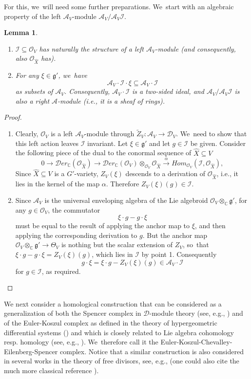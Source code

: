 \documentclass[11pt]{article}
\newcommand{\ie}{i.e.,\xspace}
\newcommand{\resp}{resp.\xspace}
\newcommand{\skpt}{\smallskip}
\let\mathds\mathbb
\newtheorem{lem}[thm]{Lemma}
\newcommand{\dC}{{\mathds C}}\let\C\dC
\newcommand{\cA}{\mathscr{A}}
\newcommand{\cD}{\mathscr{D}}
\newcommand{\cI}{\mathcal{I}}
\newcommand{\cO}{\mathcal{O}}\let\O\cO
\newcommand{\frg}{\mathfrak{g}}
\begin{document}
For this, we~will need some further preparations. We~start with an algebraic property of the left $\cA_V$\nobreakdash-mod\-ule
$\cA_V/\cA_V\cI$.

\skpt
\begin{lem}
\label{lem:IleftAmod}
\begin{enumerate}
\item
$\cI\subseteq\cO_V$ has naturally the structure of a left $\cA_V$\nobreakdash-mod\-ule (and consequently, also $\cO_{\hat{X}}$ has).

\item
For any $\xi\in\frg'$, we~have
\[
\cA_V\cdot \cI \cdot \xi \subseteq\cA_V\cdot \cI
\]
as subsets of $\cA_V$. Consequently, $\cA_V\cdot \cI$ is a two-sided ideal, and $\cA_V/\cA_V\cI$
is also a right $\cA$\nobreakdash-mod\-ule (\ie it is a sheaf of rings).
\end{enumerate}
\end{lem}

\skpt
\begin{proof}
\begin{enumerate}
\item
Clearly, $\cO_V$ is a left $\cA_V$\nobreakdash-mod\-ule
through $\tilde{Z}_V \colon \cA_V\to \cD_V$. We~need to show that this left action leaves $\cI$ invariant. Let $\xi\in \frg'$ and let $g\in \cI$ be given.
Consider the following piece
of the dual to the conormal sequence of $\hat{X}\subseteq V$
\[
0\to
{\cD\!}er_{\dC}(\cO_{\hat{X}})
\to
{\cD\!er}_{\dC}(\cO_V)\otimes_{\cO_V}\cO_{\hat{X}}
\stackrel{\alpha}{\to} {H\!}om_{\cO_V}(\cI,\cO_{\hat{X}}),
\]
Since $\hat{X}\subseteq V$ is a $G'$-variety, $Z_V(\xi)$ descends to a derivation of $\cO_{\hat{X}}$, \ie it lies in the kernel of the map $\alpha$. Therefore $Z_V(\xi)(g)\in \cI$.
\item
Since $\cA_V$ is the universal enveloping algebra of the Lie algebroid $\cO_V\otimes_\dC \frg'$, for any $g\in \cO_V$, the commutator
\[
\xi\cdot g-g\cdot\xi
\]
must be equal to the result of applying the anchor map to $\xi$, and then applying the corresponding derivation to $g$. But the anchor map $\cO_V\otimes_\dC\frg'\to \Theta_V$ is nothing but the scalar extension of $Z_V$, so~that $\xi\cdot g-g\cdot\xi=Z_V(\xi)(g)$, which lies in $\cI$ by point 1. Consequently
\[
g\cdot \xi=\xi\cdot g-Z_V(\xi)(g) \in \cA_V\cdot \cI
\]
for $g\in \mathcal{I}$, as required.\qedhere
\end{enumerate}
\end{proof}

We next consider a homological construction that can be considered as a generalization of both the Spencer complex in $\cD$\nobreakdash-mod\-ule theory (see, e.g., \cite[Lem.\,1.5.27.]{Hotta}) and of the Euler-Koszul complex as defined in the theory of hypergeometric differential systems (\cite[\S 4]{MMW}) and which is closely related to Lie algebra cohomology \resp homology (see, e.g., \cite[\S VII.4]{HiltonStammbach}). We~therefore call it the Euler-Koszul-Chevalley-Eilenberg-Spencer complex. Notice that a similar construction is also considered in several works in the theory of free divisors, see, e.g., \cite[\S 1.1.2.]{CN08} (one could also cite the much more classical reference \cite[\S 4]{Rinehart}).
\end{document}
